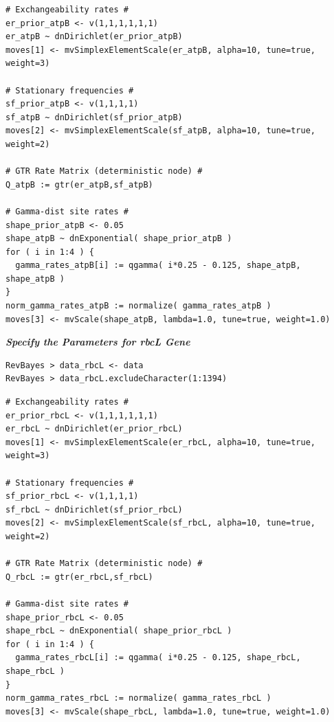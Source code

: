 \documentclass[11pt]{article}
\begin{document}
{\tt \small \begin{snugshade*}
\begin{lstlisting}
# Exchangeability rates #
er_prior_atpB <- v(1,1,1,1,1,1)                                                                      
er_atpB ~ dnDirichlet(er_prior_atpB)
moves[1] <- mvSimplexElementScale(er_atpB, alpha=10, tune=true, weight=3)

# Stationary frequencies #
sf_prior_atpB <- v(1,1,1,1)   
sf_atpB ~ dnDirichlet(sf_prior_atpB)
moves[2] <- mvSimplexElementScale(sf_atpB, alpha=10, tune=true, weight=2)

# GTR Rate Matrix (deterministic node) # 
Q_atpB := gtr(er_atpB,sf_atpB)                                                                                

# Gamma-dist site rates #
shape_prior_atpB <- 0.05                                                                             
shape_atpB ~ dnExponential( shape_prior_atpB )
for ( i in 1:4 ) {
  gamma_rates_atpB[i] := qgamma( i*0.25 - 0.125, shape_atpB, shape_atpB )
}
norm_gamma_rates_atpB := normalize( gamma_rates_atpB )
moves[3] <- mvScale(shape_atpB, lambda=1.0, tune=true, weight=1.0)
\end{lstlisting}
\end{snugshade*}}

\textbf{\textit{Specify the Parameters for rbcL Gene}}

{\tt \begin{snugshade*}
\begin{lstlisting}
RevBayes > data_rbcL <- data
RevBayes > data_rbcL.excludeCharacter(1:1394)
\end{lstlisting}
\end{snugshade*}}

{\tt \small \begin{snugshade*}
\begin{lstlisting}
# Exchangeability rates #
er_prior_rbcL <- v(1,1,1,1,1,1)                                                                      
er_rbcL ~ dnDirichlet(er_prior_rbcL)
moves[1] <- mvSimplexElementScale(er_rbcL, alpha=10, tune=true, weight=3)

# Stationary frequencies #
sf_prior_rbcL <- v(1,1,1,1)   
sf_rbcL ~ dnDirichlet(sf_prior_rbcL)
moves[2] <- mvSimplexElementScale(sf_rbcL, alpha=10, tune=true, weight=2)

# GTR Rate Matrix (deterministic node) # 
Q_rbcL := gtr(er_rbcL,sf_rbcL)                                                                                

# Gamma-dist site rates #
shape_prior_rbcL <- 0.05                                                                             
shape_rbcL ~ dnExponential( shape_prior_rbcL )
for ( i in 1:4 ) {
  gamma_rates_rbcL[i] := qgamma( i*0.25 - 0.125, shape_rbcL, shape_rbcL )
}
norm_gamma_rates_rbcL := normalize( gamma_rates_rbcL )
moves[3] <- mvScale(shape_rbcL, lambda=1.0, tune=true, weight=1.0)
\end{lstlisting}
\end{snugshade*}}
\end{document}
